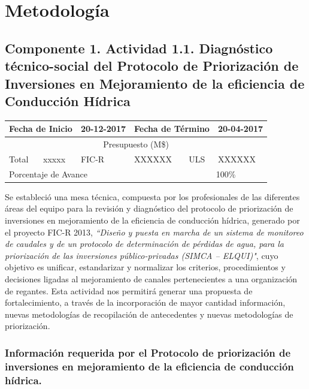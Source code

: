 \documentclass[]{article}
\begin{document}
\clearpage
\section{Metodología}

\subsection{Componente 1. Actividad 1.1. Diagnóstico técnico-social del Protocolo de Priorización de Inversiones en Mejoramiento de la eficiencia de Conducción Hídrica}

\begin{table}[!htb]
\centering
\begin{tabular}{|p{2cm}|p{2cm}|p{2cm}|p{2cm}|p{2cm}|p{2cm}|}
    \hline
    \multicolumn{2}{|l|}{Fecha de Inicio} & 20-12-2017 & \multicolumn{2}{l|}{Fecha de Término} & 20-04-2017\\
    \hline
    \multicolumn{6}{|c|}{Presupuesto (M\$)}\\
    \hline
    Total & xxxxx & FIC-R & XXXXXX & ULS & XXXXXX\\
    \hline
    \multicolumn{4}{|l|}{Porcentaje de Avance} & \multicolumn{2}{c|}{100\%}\\
    \hline
\end{tabular}
\end{table}

Se estableció una mesa técnica, compuesta por los profesionales de las diferentes áreas del equipo para la revisión y diagnóstico del protocolo de priorización de inversiones en mejoramiento de la eficiencia de conducción hídrica, generado por el proyecto FIC-R 2013, \textit{``Diseño y puesta en marcha de un sistema de monitoreo de caudales y de un protocolo de determinación de pérdidas de agua, para la priorización de las inversiones público-privadas (SIMCA – ELQUI)"}, cuyo objetivo es unificar, estandarizar y normalizar los criterios, procedimientos y decisiones ligadas al mejoramiento de canales pertenecientes a una organización de regantes. Esta actividad nos permitirá generar una propuesta de fortalecimiento, a través de la incorporación de mayor cantidad información, nuevas metodologías de recopilación de antecedentes y nuevas metodologías de priorización.

\subsubsection{Información requerida por el Protocolo de priorización de inversiones en mejoramiento de la eficiencia de conducción hídrica.}
\end{document}
